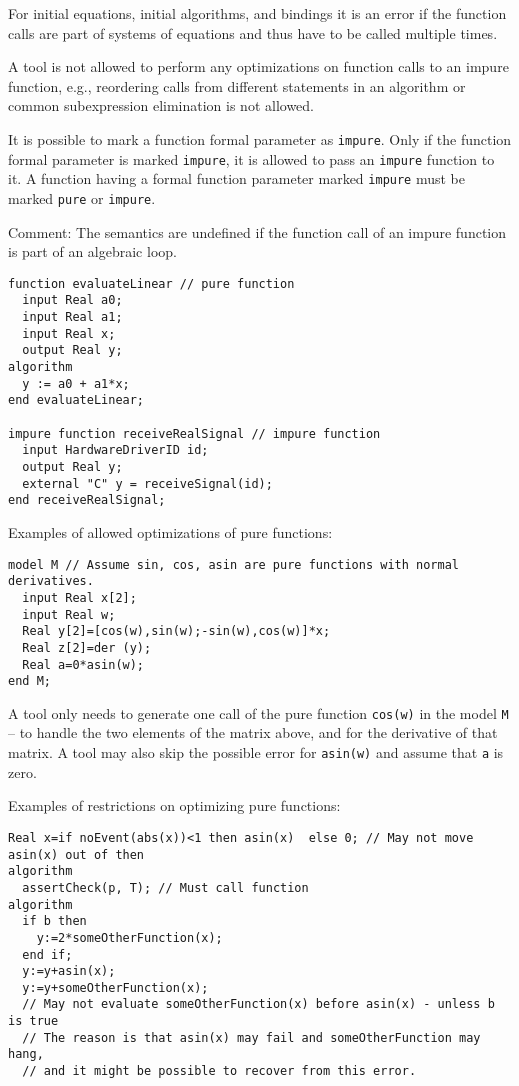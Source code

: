 For initial equations, initial algorithms, and bindings it is an error
if the function calls are part of systems of equations and thus have to
be called multiple times.

\begin{nonnormative}
A tool is not allowed to perform any optimizations on function
calls to an impure function, e.g., reordering calls from different
statements in an algorithm or common subexpression elimination is not
allowed.
\end{nonnormative}

It is possible to mark a function formal parameter as \lstinline!impure!. Only if
the function formal parameter is marked \lstinline!impure!, it is allowed to pass an
\lstinline!impure! function to it. A function having a formal function parameter
marked \lstinline!impure! must be marked \lstinline!pure! or \lstinline!impure!.

\begin{nonnormative}
Comment: The semantics are undefined if the function call of an
impure function is part of an algebraic loop.
\end{nonnormative}

\begin{example}
\begin{lstlisting}[language=modelica]
function evaluateLinear // pure function
  input Real a0;
  input Real a1;
  input Real x;
  output Real y;
algorithm
  y := a0 + a1*x;
end evaluateLinear;

impure function receiveRealSignal // impure function
  input HardwareDriverID id;
  output Real y;
  external "C" y = receiveSignal(id);
end receiveRealSignal;
\end{lstlisting}
Examples of allowed optimizations of pure functions:
\begin{lstlisting}[language=modelica]
model M // Assume sin, cos, asin are pure functions with normal derivatives.
  input Real x[2];
  input Real w;
  Real y[2]=[cos(w),sin(w);-sin(w),cos(w)]*x;
  Real z[2]=der (y);
  Real a=0*asin(w);
end M;
\end{lstlisting}
A tool only needs to generate one call of the pure function \lstinline!cos(w)!
in the model \lstinline!M! -- to handle the two elements of the matrix above, and
for the derivative of that matrix. A tool may also skip the possible
error for \lstinline!asin(w)! and assume that \lstinline!a! is zero.

Examples of restrictions on optimizing pure functions:
\begin{lstlisting}[language=modelica]
  Real x=if noEvent(abs(x))<1 then asin(x)  else 0; // May not move asin(x) out of then
algorithm
  assertCheck(p, T); // Must call function
algorithm
  if b then
    y:=2*someOtherFunction(x);
  end if;
  y:=y+asin(x);
  y:=y+someOtherFunction(x);
  // May not evaluate someOtherFunction(x) before asin(x) - unless b is true
  // The reason is that asin(x) may fail and someOtherFunction may hang,
  // and it might be possible to recover from this error.
\end{lstlisting}
\end{example}

